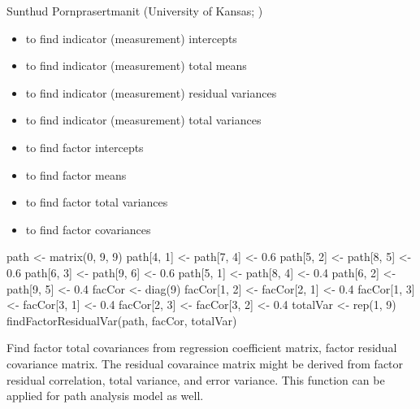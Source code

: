 \documentclass[a4paper]{book}
\begin{document}
%
\begin{Author}\relax
Sunthud Pornprasertmanit (University of Kansas; )
\end{Author}
%
\begin{SeeAlso}\relax
\begin{itemize}

\item {} to find indicator (measurement) intercepts
\item {} to find indicator (measurement) total means
\item {} to find indicator (measurement) residual variances
\item {} to find indicator (measurement) total variances
\item {} to find factor intercepts
\item {} to find factor means
\item {} to find factor total variances
\item {} to find factor covariances

\end{itemize}

\end{SeeAlso}
%
\begin{Examples}
\begin{ExampleCode}
path <- matrix(0, 9, 9)
path[4, 1] <- path[7, 4] <- 0.6
path[5, 2] <- path[8, 5] <- 0.6
path[6, 3] <- path[9, 6] <- 0.6
path[5, 1] <- path[8, 4] <- 0.4
path[6, 2] <- path[9, 5] <- 0.4
facCor <- diag(9)
facCor[1, 2] <- facCor[2, 1] <- 0.4
facCor[1, 3] <- facCor[3, 1] <- 0.4
facCor[2, 3] <- facCor[3, 2] <- 0.4
totalVar <- rep(1, 9)
findFactorResidualVar(path, facCor, totalVar)
\end{ExampleCode}
\end{Examples}
%
\begin{Description}\relax
Find factor total covariances from regression coefficient matrix, factor residual covariance matrix. The residual covaraince matrix might be derived from factor residual correlation, total variance, and error variance. This function can be applied for path analysis model as well. 
\end{Description}
\end{document}
